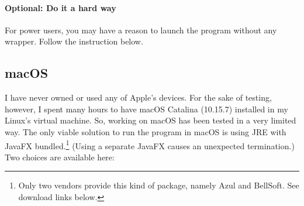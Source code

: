 
\paragraph{Optional: Do it a hard way} For power users, you may have a reason to launch the program without any wrapper. Follow the instruction below.


\subsection{macOS}

I have never owned or used any of Apple's devices. For the sake of testing, however, I spent many hours to have macOS Catalina (10.15.7) installed in my Linux's virtual machine. So, working on macOS has been tested in a very limited way. The only viable solution to run the program in macOS is using JRE with JavaFX bundled.\footnote{Only two vendors provide this kind of package, namely Azul and BellSoft. See download links below.} (Using a separate JavaFX causes an unexpected termination.) Two choices are available here:

